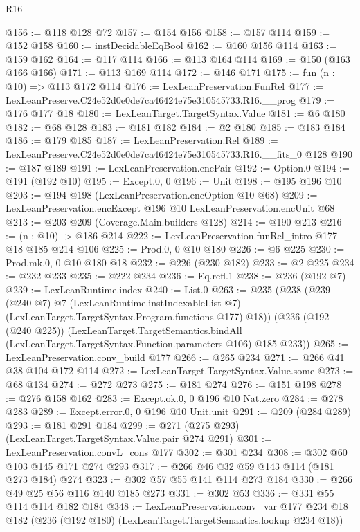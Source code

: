 \begin{lexlean}{R16}
\begin{coremodule}
@156 := @118 @128 @72
@157 := @154 @156
@158 := @157 @114
@159 := @152 @158
@160 := instDecidableEqBool
@162 := @160 @156 @114
@163 := @159 @162
@164 := @117 @114
@166 := @113 @164 @114
@169 := @150 (@163 @166 @166)
@171 := @113 @169 @114
@172 := @146 @171
@175 := fun (n : @10) => @113 @172 @114
@176 := LexLeanPreservation.FunRel
@177 := LexLeanPreserve.C24e52d0e0de7ca46424e75e310545733.R16.__prog
@179 := @176 @177 @18
@180 := LexLeanTarget.TargetSyntax.Value
@181 := @6 @180
@182 := @68 @128
@183 := @181 @182
@184 := @2 @180
@185 := @183 @184
@186 := @179 @185
@187 := LexLeanPreservation.Rel
@189 := LexLeanPreserve.C24e52d0e0de7ca46424e75e310545733.R16.__fits_0 @128
@190 := @187 @189
@191 := LexLeanPreservation.encPair
@192 := Option.{0}
@194 := @191 (@192 @10)
@195 := Except.{0, 0}
@196 := Unit
@198 := @195 @196 @10
@203 := @194 @198 (LexLeanPreservation.encOption @10 @68)
@209 := LexLeanPreservation.encExcept @196 @10 LexLeanPreservation.encUnit @68
@213 := @203 @209 (Coverage.Main.builders @128)
@214 := @190 @213
@216 := (n : @10) -> @186 @214
@222 := LexLeanPreservation.funRel_intro @177 @18 @185 @214 @106
@225 := Prod.{0, 0} @10 @180
@226 := @6 @225
@230 := Prod.mk.{0, 0} @10 @180 @18
@232 := @226 (@230 @182)
@233 := @2 @225
@234 := @232 @233
@235 := @222 @234
@236 := Eq.refl.{1}
@238 := @236 (@192 @7)
@239 := LexLeanRuntime.index
@240 := List.{0}
@263 := @235
    (@238
      (@239
        (@240 @7)
        @7
        (LexLeanRuntime.instIndexableList @7)
        (LexLeanTarget.TargetSyntax.Program.functions @177)
        @18))
    (@236
      (@192 (@240 @225))
      (LexLeanTarget.TargetSemantics.bindAll
        (LexLeanTarget.TargetSyntax.Function.parameters @106)
        @185
        @233))
@265 := LexLeanPreservation.conv_build @177
@266 := @265 @234
@271 := @266 @41 @38 @104 @172 @114
@272 := LexLeanTarget.TargetSyntax.Value.some
@273 := @68 @134
@274 := @272 @273
@275 := @181 @274
@276 := @151 @198
@278 := @276 @158 @162
@283 := Except.ok.{0, 0} @196 @10 Nat.zero
@284 := @278 @283
@289 := Except.error.{0, 0} @196 @10 Unit.unit
@291 := @209 (@284 @289)
@293 := @181 @291 @184
@299 := @271 (@275 @293) (LexLeanTarget.TargetSyntax.Value.pair @274 @291)
@301 := LexLeanPreservation.convL_cons @177
@302 := @301 @234
@308 := @302 @60 @103 @145 @171 @274 @293
@317 := @266 @46 @32 @59 @143 @114 (@181 @273 @184) @274
@323 := @302 @57 @55 @141 @114 @273 @184
@330 := @266 @49 @25 @56 @116 @140 @185 @273
@331 := @302 @53
@336 := @331 @55 @114 @114 @182 @184
@348 := LexLeanPreservation.conv_var
    @177
    @234
    @18
    @182
    (@236 (@192 @180) (LexLeanTarget.TargetSemantics.lookup @234 @18))

\end{coremodule}
\end{lexlean}
